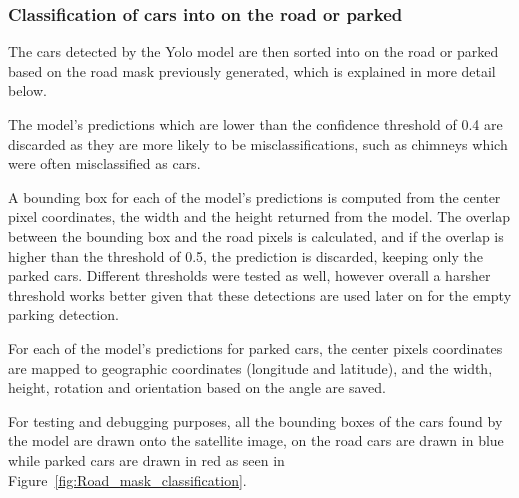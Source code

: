 \newpage

\subsubsection{Classification of cars into on the road or parked}
The cars detected by the Yolo model are then sorted into on the road or parked based on the road mask previously generated, which is explained in more detail below.

The model's predictions which are lower than the confidence threshold of 0.4 are discarded as they are more likely to be misclassifications, such as chimneys which were often misclassified as cars.

A bounding box for each of the model's predictions is computed from the center pixel coordinates, the width and the height returned from the model.
The overlap between the bounding box and the road pixels is calculated, and if the overlap is higher than the threshold of 0.5, the prediction is discarded, keeping only the parked cars.
Different thresholds were tested as well, however overall a harsher threshold works better given that these detections are used later on for the empty parking detection.

For each of the model's predictions for parked cars, the center pixels coordinates are mapped to geographic coordinates (longitude and latitude), and the width, height, rotation and orientation based on the angle are saved.

For testing and debugging purposes, all the bounding boxes of the cars found by the model are drawn onto the satellite image, on the road cars are drawn in blue while parked cars are drawn in red as seen in Figure~\ref{fig:Road_mask_classification}.

